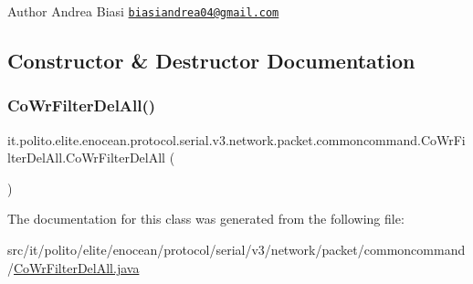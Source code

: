 \begin{DoxyAuthor}{Author}
Andrea Biasi \href{mailto:biasiandrea04@gmail.com}{\tt biasiandrea04@gmail.\+com} 
\end{DoxyAuthor}


\subsection{Constructor \& Destructor Documentation}
\hypertarget{classit_1_1polito_1_1elite_1_1enocean_1_1protocol_1_1serial_1_1v3_1_1network_1_1packet_1_1common388b9388c32720652fa6fbd608c9c62c_af22f811d0aead02eb7d2653d2ec00dd4}{}\label{classit_1_1polito_1_1elite_1_1enocean_1_1protocol_1_1serial_1_1v3_1_1network_1_1packet_1_1common388b9388c32720652fa6fbd608c9c62c_af22f811d0aead02eb7d2653d2ec00dd4} 
\subsubsection{\texorpdfstring{Co\+Wr\+Filter\+Del\+All()}{CoWrFilterDelAll()}}
{\footnotesize\ttfamily it.\+polito.\+elite.\+enocean.\+protocol.\+serial.\+v3.\+network.\+packet.\+commoncommand.\+Co\+Wr\+Filter\+Del\+All.\+Co\+Wr\+Filter\+Del\+All (\begin{DoxyParamCaption}{ }\end{DoxyParamCaption})}



The documentation for this class was generated from the following file\+:\begin{DoxyCompactItemize}
\item 
src/it/polito/elite/enocean/protocol/serial/v3/network/packet/commoncommand/\hyperlink{_co_wr_filter_del_all_8java}{Co\+Wr\+Filter\+Del\+All.\+java}\end{DoxyCompactItemize}
